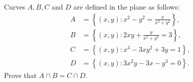 Curves $A,B,C$ and $D$ are defined in the plane as follows:
\begin{align*}
A &= \left\{ (x,y): x^2-y^2 = \frac{x}{x^2+y^2} \right\}, \\
B &= \left\{ (x,y): 2xy + \frac{y}{x^2+y^2} = 3 \right\}, \\
C &= \left\{ (x,y): x^3-3xy^2+3y=1 \right\}, \\
D &= \left\{ (x,y): 3x^2 y - 3x - y^3 = 0\right\}.
\end{align*}
Prove that $A \cap B = C \cap D$.
